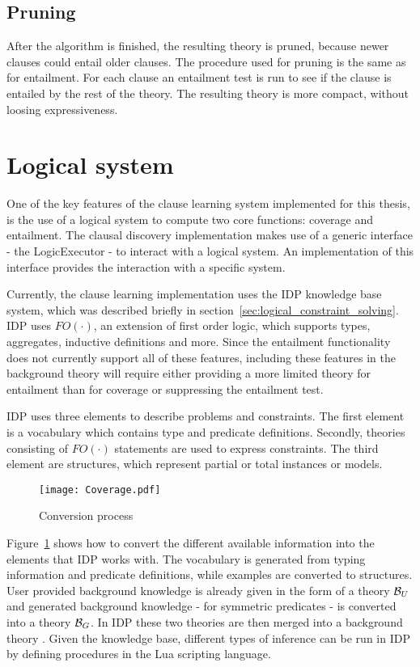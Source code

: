 \subsection{Pruning}
After the algorithm is finished, the resulting theory is pruned, because newer clauses could entail older clauses.
The procedure used for pruning is the same as for entailment.
For each clause an entailment test is run to see if the clause is entailed by the rest of the theory.
The resulting theory is more compact, without loosing expressiveness.

\section{Logical system}
\label{sec:logical_system}
One of the key features of the clause learning system implemented for this thesis, is the use of a logical system to compute two core functions: coverage and entailment.
The clausal discovery implementation makes use of a generic  interface - the LogicExecutor - to interact with a logical system.
An implementation of this interface provides the interaction with a specific system.

Currently, the clause learning implementation uses the IDP knowledge base system, which was described briefly in section~\ref{sec:logical_constraint_solving}.
IDP uses $FO(\cdotp)$, an extension of first order logic, which supports types, aggregates, inductive definitions and more.
Since the entailment functionality does not currently support all of these features, including these features in the background theory will require either providing a more limited theory for entailment than for coverage or suppressing the entailment test.

IDP uses three elements to describe problems and constraints.
The first element is a vocabulary which contains type and predicate definitions.
Secondly, theories consisting of $FO(\cdotp)$ statements are used to express constraints.
The third element are structures, which represent partial or total instances or models.

\begin{figure}

	\caption{Conversion process}
	\centering
		\texttt{[image: Coverage.pdf]}
	\label{fig:conversion_to_logic}

\end{figure}

Figure~\ref{fig:conversion_to_logic} shows how to convert the different available information into the elements that IDP works with.
The vocabulary is generated from typing information and predicate definitions, while examples are converted to structures.
User provided background knowledge is already given in the form of a theory $\mathcal{B}_U$ and generated background knowledge - for symmetric predicates - is converted into a theory $\mathcal{B}_G$.
In IDP these two theories are then merged into a background theory .
Given the knowledge base, different types of inference can be run in IDP by defining procedures in the Lua scripting language.

